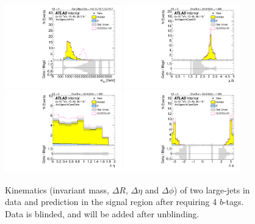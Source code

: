 \begin{figure}[htbp!]
\begin{center}
\includegraphics[width=0.45\textwidth,angle=-90]{figures/boosted/Signal/b77_FourTag_Signal_mHH_l_blind.pdf}
\includegraphics[width=0.45\textwidth,angle=-90]{figures/boosted/Signal/b77_FourTag_Signal_hCandDr_blind.pdf}\\
\includegraphics[width=0.45\textwidth,angle=-90]{figures/boosted/Signal/b77_FourTag_Signal_hCandDeta_blind.pdf}
\includegraphics[width=0.45\textwidth,angle=-90]{figures/boosted/Signal/b77_FourTag_Signal_hCandDphi_blind.pdf}
  \caption{Kinematics (invariant mass, $\Delta R$, $\Delta \eta$ and $\Delta \phi$) of two large-\R jets in data and prediction in the signal region after requiring 4 $b$-tags. Data is blinded, and will be added after unblinding. }
  \label{fig:boosted-4b-signal-blind-ak10-system}
\end{center}
\end{figure}

